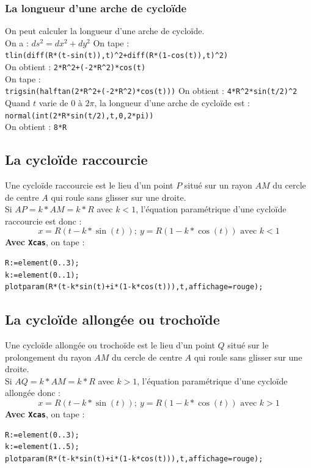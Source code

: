 \documentclass[a4paper,11pt]{book}
\begin{document}
\subsubsection{La longueur d'une arche de cyclo\"ide}
On peut calculer la longueur d'une arche de cyclo\"ide.\\
On a :
$ds^2=dx^2+dy^2$
On tape :\\
{\tt tlin(diff(R*(t-sin(t)),t)\verb|^|2+diff(R*(1-cos(t)),t)\verb|^|2)}\\
On obtient :
{\tt 2*R\verb|^|2+(-2*R\verb|^|2)*cos(t)}\\
On tape :\\
{\tt trigsin(halftan(2*R\verb|^|2+(-2*R\verb|^|2)*cos(t)))}
On obtient :
{\tt 4*R\verb|^|2*sin(t/2)\verb|^|2}\\
Quand $t$ varie de 0 \`a $2\pi$, la longueur d'une arche de cyclo\"ide est :\\
{\tt normal(int(2*R*sin(t/2),t,0,2*pi))}\\
On obtient :
{\tt 8*R}
\subsection{La cyclo\"ide raccourcie}
Une cyclo\"ide raccourcie est le lieu d'un point $P$ situ\'e sur un rayon $AM$ du
cercle de centre $A$ qui roule sans glisser sur une droite.\\
Si $AP=k*AM=k*R$ avec $k<1$, l'\'equation param\'etrique d'une cyclo\"ide  
raccourcie est donc :\\
$$x=R(t-k*\sin(t));\ y=R(1-k*\cos(t))\mbox{ avec } k<1$$
{\bf Avec {\tt Xcas}}, on tape :
\begin{verbatim}
R:=element(0..3);
k:=element(0..1);
plotparam(R*(t-k*sin(t)+i*(1-k*cos(t))),t,affichage=rouge);
\end{verbatim}
\subsection{La cyclo\"ide allong\'ee ou trocho\"ide}
Une cyclo\"ide allong\'ee ou trocho\"ide est le lieu d'un point $Q$ situ\'e sur le 
prolongement du rayon $AM$ du cercle de centre $A$ qui roule sans glisser sur 
une droite.\\
Si $AQ=k*AM=k*R$ avec $k>1$, l'\'equation param\'etrique d'une cyclo\"ide  
allong\'ee donc :\\
$$x=R(t-k*\sin(t));\ y=R(1-k*\cos(t)) \mbox{ avec } k>1$$
{\bf Avec {\tt Xcas}}, on tape :
\begin{verbatim}
R:=element(0..3);
k:=element(1..5);
plotparam(R*(t-k*sin(t)+i*(1-k*cos(t))),t,affichage=rouge);
\end{verbatim}
\end{document}
